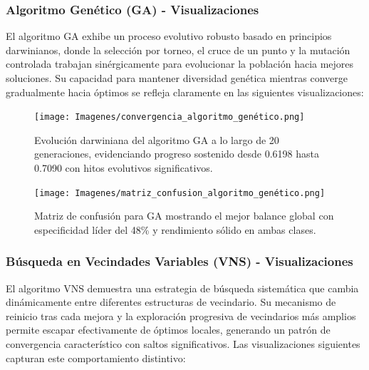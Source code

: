 \newpage

\subsubsection{Algoritmo Genético (GA) - Visualizaciones}

El algoritmo GA exhibe un proceso evolutivo robusto basado en principios darwinianos, donde la selección por torneo, el cruce de un punto y la mutación controlada trabajan sinérgicamente para evolucionar la población hacia mejores soluciones. Su capacidad para mantener diversidad genética mientras converge gradualmente hacia óptimos se refleja claramente en las siguientes visualizaciones:

\begin{figure}[h!]
    \centering
    \texttt{[image: Imagenes/convergencia\_algoritmo\_genético.png]}
    \caption{Evolución darwiniana del algoritmo GA a lo largo de 20 generaciones, evidenciando progreso sostenido desde 0.6198 hasta 0.7090 con hitos evolutivos significativos.}
    \label{fig:convergencia_ga}
\end{figure}

\begin{figure}[h!]
    \centering
    \texttt{[image: Imagenes/matriz\_confusion\_algoritmo\_genético.png]}
    \caption{Matriz de confusión para GA mostrando el mejor balance global con especificidad líder del 48\% y rendimiento sólido en ambas clases.}
    \label{fig:matriz_ga}
\end{figure}

\newpage

\subsubsection{Búsqueda en Vecindades Variables (VNS) - Visualizaciones}

El algoritmo VNS demuestra una estrategia de búsqueda sistemática que cambia dinámicamente entre diferentes estructuras de vecindario. Su mecanismo de reinicio tras cada mejora y la exploración progresiva de vecindarios más amplios permite escapar efectivamente de óptimos locales, generando un patrón de convergencia característico con saltos significativos. Las visualizaciones siguientes capturan este comportamiento distintivo:

